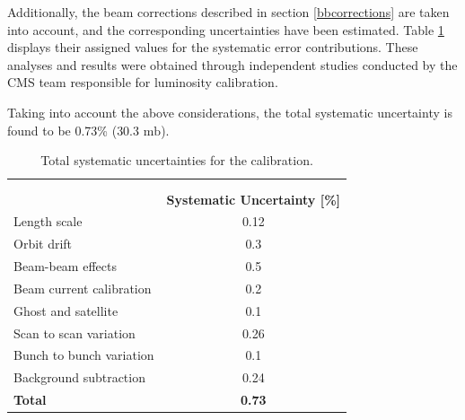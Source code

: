 Additionally, the beam corrections described in section \ref{bbcorrections} are taken into account, and the corresponding uncertainties have been estimated. Table \ref{systematics} displays their assigned values for the systematic error contributions. These analyses and results were obtained through independent studies conducted by the CMS team responsible for luminosity calibration.

Taking into account the above considerations, the total systematic uncertainty is found to be 0.73\% ($30.3 \text{ mb}$).
\begin{table}[!ht]
\centering
\caption[Systematic Uncertainties]{Total systematic uncertainties for the calibration.}
\label{systematics}
\begin{tabular}{lc}
                               & \multicolumn{1}{l}{}       \\
                               & \multicolumn{1}{l}{}       \\
            & \textbf{Systematic Uncertainty [\%]}  \\ 
\toprule
Length scale                   & 0.12                        \\
Orbit drift                    & 0.3                        \\
Beam-beam effects              & 0.5                        \\
Beam current calibration       & 0.2                        \\
Ghost and satellite            & 0.1                        \\
Scan to scan variation         & 0.26                        \\
Bunch to bunch variation       & 0.1                        \\
Background subtraction         & 0.24                          \\ 
\hline
\textbf{Total}                 & \textbf{0.73}               
\end{tabular}
\end{table}


